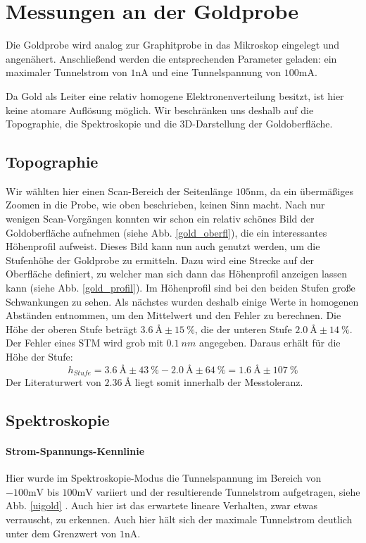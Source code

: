 
\section{Messungen an der Goldprobe}
 Die Goldprobe wird analog zur Graphitprobe in das Mikroskop eingelegt und angenähert. Anschließend werden die entsprechenden Parameter geladen: ein maximaler Tunnelstrom von $1\si{\nano\ampere}$ und eine Tunnelspannung von $100\si{\milli\ampere}$.

Da Gold als Leiter eine relativ homogene Elektronenverteilung besitzt, ist hier keine atomare Auflösung möglich. Wir beschränken uns deshalb auf die Topographie, die Spektroskopie und die 3D-Darstellung der Goldoberfläche.

\subsection{Topographie}
Wir wählten hier einen Scan-Bereich der Seitenlänge $105\si{\nano\meter}$, da ein übermäßiges Zoomen in die Probe, wie oben beschrieben, keinen Sinn macht. Nach nur wenigen Scan-Vorgängen konnten wir schon ein relativ schönes Bild der Goldoberfläche aufnehmen (siehe Abb. \ref{gold_oberfl}), die ein interessantes Höhenprofil aufweist. Dieses Bild kann nun auch genutzt werden, um die Stufenhöhe der Goldprobe zu ermitteln. Dazu wird eine Strecke auf der Oberfläche definiert, zu welcher man sich dann das Höhenprofil anzeigen lassen kann (siehe Abb. \ref{gold_profil}).
Im Höhenprofil sind bei den beiden Stufen große Schwankungen zu sehen.
Als nächstes wurden deshalb einige Werte in homogenen Abständen entnommen, 
um den Mittelwert und den Fehler zu berechnen. Die Höhe der oberen Stufe
beträgt $\SI{3,6}{\angstrom} \pm \SI{15}{\percent}$, die der unteren Stufe 
$\SI{2,0}{\angstrom} \pm \SI{14}{\percent}$. Der Fehler eines STM wird grob mit 
$\SI{0,1}{nm}$ angegeben. Daraus erhält für die Höhe der Stufe:
\[
    h_{Stufe} = \SI{3,6}{\angstrom} \pm \SI{43}{\percent}
                - \SI{2,0}{\angstrom} \pm \SI{64}{\percent}
              = \SI{1,6}{\angstrom} \pm \SI{107}{\percent}
\]
Der Literaturwert von $\SI{2,36}{\angstrom}$ liegt somit innerhalb der Messtoleranz.

\subsection{Spektroskopie}
\paragraph{Strom-Spannungs-Kennlinie} Hier wurde im Spektroskopie-Modus die Tunnelspannung im Bereich von $-100\si{\milli\volt}$ bis $100\si{\milli\volt}$ variiert und der resultierende Tunnelstrom aufgetragen, siehe Abb. \ref{uigold} . Auch hier ist das erwartete lineare Verhalten, zwar etwas verrauscht, zu erkennen. Auch hier hält sich der maximale Tunnelstrom deutlich unter dem Grenzwert von $1\si{\nano\ampere}$.
